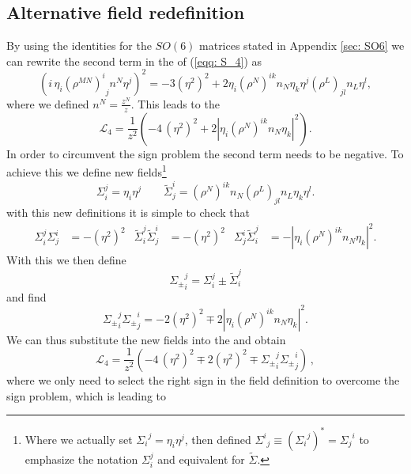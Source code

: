 \subsection{Alternative field redefinition}
By using the identities for the $SO(6)$ matrices stated in Appendix \ref{sec: SO6} we can rewrite the second term in the  of (\ref{eqq: S_4}) as
%
%
\begin{equation}
\left(i\, \eta_i {(\rho^{MN})^i}_j n^N \eta^j\right)^2=-3 (\eta^2)^2+2\eta_i (\rho^N)^{ik} n_N \eta_k \eta^j (\rho^L)_{jl} n_L \eta^l,
\end{equation}
%
%
where we defined $n^{N}=\tfrac{z^{N}}{z}$. This leads to the 
%
%
\begin{equation}
\mathcal{L}_4=\frac{1}{z^2}\left(- 4\, (\eta^2)^2+2\left|\eta_i (\rho^N)^{ik} n_N \eta_k\right|^2\right).
\end{equation}
%
%
In order to circumvent the sign problem the second term needs to be negative. To achieve this we define new fields\footnote{Where we actually set ${\Sigma_i}^j=\eta_i \eta^j$, then defined ${\Sigma^{i}}_{j}\equiv({\Sigma_i}^{j})^{*}={\Sigma_{j}}^{i}$ to emphasize the notation $\Sigma_i^j$ and equivalent for $\tilde{\Sigma}$.}
%
%
\begin{equation}
\Sigma_i^j=\eta_i \eta^j \qquad \tilde{\Sigma}_j^i=(\rho^N)^{ik}n_N (\rho^L)_{jl}n_L \eta_k \eta^l.
\end{equation}
%
%
with this new definitions it is simple to check that
%
%
\begin{align}
 \Sigma^j_{i}\Sigma^i_j&=-(\eta^2)^2 & \tilde\Sigma^j_{i} \tilde\Sigma^i_j&=-(\eta^2)^2 & \Sigma^i_j \tilde\Sigma^j_i&=-\left|\eta_i (\rho^N)^{ik} n_N \eta_k\right|^2.
\end{align}
%
%
With this we then define
%
%
\begin{equation}
{\Sigma_{\pm}}_i^j=\Sigma_i^j\pm \tilde \Sigma_i^j
\end{equation}
%
%
and find
%
%
\begin{equation}
 {\Sigma_{\pm}}_i^j{\Sigma_{\pm}}_j^i=-2(\eta^2)^2 \mp 2\left|\eta_i (\rho^N)^{ik} n_N \eta_k\right|^2.
\end{equation}
%
%
We can thus substitute the new fields into the  and obtain
%
%
\begin{equation}
\mathcal{L}_4=\frac{1}{z^2}\left(- 4\, (\eta^2)^2 \mp 2(\eta^2)^2 \mp {\Sigma_{\pm}}_i^j{\Sigma_{\pm}}_j^i \right)\,,
\end{equation}
%
%
where we only need to select the right sign in the field definition to overcome the sign problem, which is leading to
